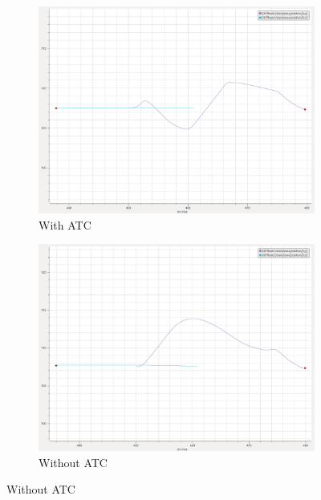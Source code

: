         \begin{figure}[H]
        \centering
        
            \begin{subfigure}[b]{0.45\textwidth}
                \centering
                \includegraphics[width=\textwidth]{figs/plot_headOn_E.png}
                \caption{With \ac{ATC}}
                \label{fig:plot_headOn_E}
            \end{subfigure}
            \begin{subfigure}[b]{0.45\textwidth}
                \centering
                \includegraphics[width=\textwidth]{figs/plot_noATC_headOn_E.png}
                \caption{Without \ac{ATC}}
                \label{fig:plot_noATC_headOn_E}
            \end{subfigure}
            

\end{figure}
